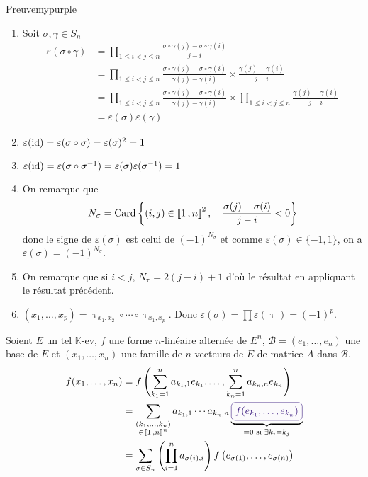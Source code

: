     \begin{demo}{Preuve}{mypurple}
        \begin{enumerate}
            \item Soit $\sigma,\gamma \in S_n$
            \begin{align*}
                \varepsilon(\sigma \circ \gamma) 
                &= \prod_{1 \leq i < j \leq n} \frac{\sigma \circ \gamma(j) - \sigma \circ \gamma(i)}{j - i} \\
                &= \prod_{1 \leq i < j \leq n} \frac{\sigma \circ \gamma(j) - \sigma \circ \gamma(i)}{\gamma(j) - \gamma(i)} \times \frac{\gamma(j) - \gamma(i)}{j - i} \\
                &= \prod_{1 \leq i < j \leq n} \frac{\sigma \circ \gamma(j) - \sigma \circ \gamma(i)}{\gamma(j) - \gamma(i)} \times \prod_{1 \leq i < j \leq n} \frac{\gamma(j) - \gamma(i)}{j - i} \\
                &= \varepsilon(\sigma) \varepsilon(\gamma)
            \end{align*}
            \item $\varepsilon(\operatorname{id}) = \varepsilon(\sigma \circ \sigma) = \varepsilon(\sigma)^2 = 1$
            \item $\varepsilon(\operatorname{id}) = \varepsilon(\sigma \circ \sigma^{-1}) = \varepsilon(\sigma) \varepsilon(\sigma^{-1}) = 1$
            \item On remarque que 
            \[ N_{\sigma} = \operatorname{Card}\left\{ (i,j) \in \left\llbracket 1 \, , n \right\rrbracket^2, \quad \frac{\sigma(j) - \sigma(i)}{j - i} < 0\right\} \]
            donc le signe de $\varepsilon(\sigma)$ est celui de $(-1)^{N_{\sigma}}$ et comme $\varepsilon(\sigma) \in \{ -1,1 \}$, on a $\varepsilon(\sigma) = (-1)^{N_{\sigma}}$.
            \item On remarque que si $i < j$, $N_{\uptau} = 2(j-i) + 1$ d’où le résultat en appliquant le résultat précédent.
            \item $(x_1,\ldots,x_p) = \uptau_{x_1,x_2} \circ \cdots \circ \uptau_{x_1,x_p}$. Donc $\varepsilon(\sigma) = \prod \varepsilon(\uptau) = (-1)^p$.
        \end{enumerate}
    \end{demo}

    Soient $E$ un tel $\mathbb{K}$-ev, $f$ une forme $n$-linéaire alternée de $E^n$, $\mathcal{B} = (e_1,\ldots,e_n)$ une base de $E$ et $(x_1,\ldots,x_n)$ une famille de $n$ vecteurs de $E$ de matrice $A$ dans $\mathcal{B}$.
    \begin{align*}
        f(x_1,\ldots,x_n) 
        &= f\left(\sum_{k_1=1}^{n}a_{k_1,1} e_{k_1}, \ldots, \sum_{k_n = 1}^{n} a_{k_n, n} e_{k_n}\right) \\
        &= \sum_{\substack{(k_1,\ldots,k_n) \\ \in \intervalleEntier{1}{n}^n}} a_{k_1, 1} \cdots a_{k_n,n} \underbrace{\lilbox{mypurple}{$f(e_{k_1},\ldots,e_{k_n})$}}_{= 0 \text{ si } \exists k_i = k_j} \\
        &= \sum_{\sigma \in S_n} \left(\prod_{i=1}^n a_{\sigma(i),i}\right)f\left(e_{\sigma(1)}, \ldots, e_{\sigma(n)}\right) 
    \end{align*}

